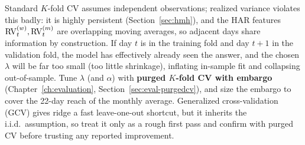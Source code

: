 \begin{warning}
Standard $K$-fold CV assumes independent observations; realized variance violates this badly: it is highly persistent (Section~\ref{sec:hmh}), and the HAR features $\operatorname{RV}^{(w)}_t,\operatorname{RV}^{(m)}_t$ are overlapping moving averages, so adjacent days share information by construction.
If day $t$ is in the training fold and day $t+1$ in the validation fold, the model has effectively already seen the answer, and the chosen $\lambda$ will be far too small (too little shrinkage), inflating in-sample fit and collapsing out-of-sample.
Tune $\lambda$ (and $\alpha$) with \textbf{purged $K$-fold CV with embargo} (Chapter~\ref{ch:evaluation}, Section~\ref{sec:eval-purgedcv}), and size the embargo to cover the 22-day reach of the monthly average.
Generalized cross-validation (GCV) gives ridge a fast leave-one-out shortcut, but it inherits the i.i.d.\ assumption, so treat it only as a rough first pass and confirm with purged CV before trusting any reported improvement.
\end{warning}

